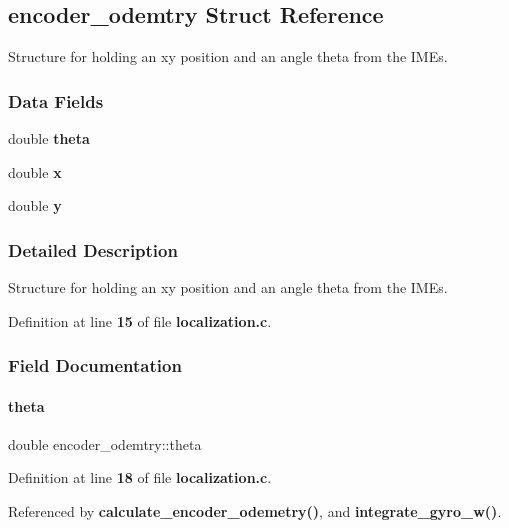 \subsection{encoder\+\_\+odemtry Struct Reference}
\label{structencoder__odemtry}


Structure for holding an xy position and an angle theta from the I\+M\+Es.  


\subsubsection*{Data Fields}
\begin{DoxyCompactItemize}
\item 
double \textbf{ theta}
\item 
double \textbf{ x}
\item 
double \textbf{ y}
\end{DoxyCompactItemize}


\subsubsection{Detailed Description}
Structure for holding an xy position and an angle theta from the I\+M\+Es. 

Definition at line \textbf{ 15} of file \textbf{ localization.\+c}.



\subsubsection{Field Documentation}
\mbox{\label{structencoder__odemtry_af1a1e2a2a7a2f89138a8c261a3b82898}} 
\paragraph{theta}
{\footnotesize\ttfamily double encoder\+\_\+odemtry\+::theta}



Definition at line \textbf{ 18} of file \textbf{ localization.\+c}.



Referenced by \textbf{ calculate\+\_\+encoder\+\_\+odemetry()}, and \textbf{ integrate\+\_\+gyro\+\_\+w()}.

\mbox{\label{structencoder__odemtry_a9a803978381f9b89a031d520a627cbcf}} 
